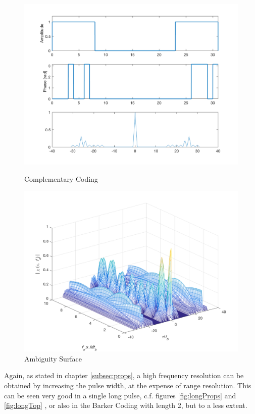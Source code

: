 \begin{figure}[!htbp]
  \centering
  \begin{minipage}[b]{0.45\textwidth}
    \includegraphics[width=\textwidth]{images/compl8_3}
    \caption{Complementary Coding}
    \label{fig:complCodingProps}
  \end{minipage}
  \hfill
  \begin{minipage}[b]{0.45\textwidth}
    \includegraphics[width=\textwidth]{images/compl8_3D}
    \caption{Ambiguity Surface}
    \label{fig:complCoding3D}
  \end{minipage}
\end{figure}

Again, as stated in chapter \ref{subsec:props}, a high frequency resolution can be obtained by increasing the pulse width, at the expense of range resolution. This can be seen very good in a single long pulse, c.f. figures \ref{fig:longProps} and \ref{fig:longTop} , or also in the Barker Coding with length 2, but to a less extent.

